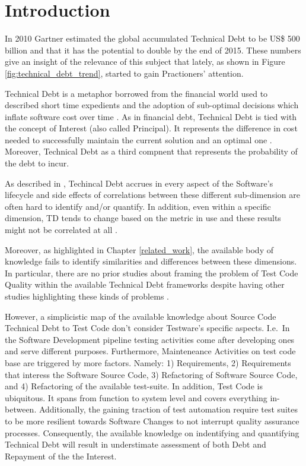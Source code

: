 \chapter{Introduction}

In 2010 Gartner estimated the global accumulated Technical Debt to be US\$ 500 billion \cite{costOfTechnicalDebt} and that it has the potential to double by the end of 2015. These numbers give an insight of the relevance of this subject that lately, as shown in Figure \ref{fig:technical_debt_trend}, started to gain Practioners' attention.

Technical Debt is a metaphor borrowed from the financial world used to described short time expedients and the adoption of sub-optimal decisions which inflate software cost over time \cite{first_mention_of_TD}. As in financial debt, Technical Debt is tied with the concept of Interest (also called Principal). It represents the difference in cost needed to successfully maintain the current solution and an optimal one \cite{technicalDebtInterest}. Moreover, Technical Debt as a third compnent that represents the probability of the debt to incur.

As described in \cite{mapping_study_td, exploration_of_td, exploration_of_td2}, Techincal Debt accrues in every aspect of the Software's lifecycle and side effects of correlations between these different sub-dimension are often hard to identify and/or quantify. In addition, even within a specific dimension, TD tends to change based on the metric in use and these results might not be correlated at all \cite{4_methods_to_identify_td}.

Moreover, as highlighted in Chapter \ref{related_work}, the available body of knowledge fails to identify similarities and differences between these dimensions. In particular, there are no prior studies about framing the problem of Test Code Quality within the available Technical Debt frameworks despite having other studies highlighting these kinds of problems \cite{gui_scripts_bad_smells,pitfalls_in_introducing_regression_testing}.

However, a simplicistic map of the available knowledge about Source Code Technical Debt to Test Code don't consider Testware's specific aspects. I.e.\ In the Software Development pipeline testing activities come after developing ones and serve different purposes. Furthermore, Mainteneance Activities on test code base are triggered by more factors. Namely: 1) Requirements, 2) Requirements that interess the Software Source Code, 3) Refactoring of Software Source Code, and 4) Refactoring of the available test-suite. In addition, Test Code is ubiquitous. It spans from function to system level and covers everything in-between. Additionally, the gaining traction of test automation require test suites to be more resilient towards Software Changes to not interrupt quality assurance processes. Consequently, the available knowledge on indentifying and quantifying Technical Debt will result in understimate assessment of both Debt and Repayment of the the Interest.

